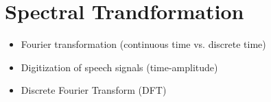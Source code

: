 
\setcounter{chapter}{2}
\chapter{Spectral Trandformation}
\thispagestyle{plain}

\begin{corollary}

	\hspace*{10mm}
	
	\vspace{5mm} %
	
	\begin{itemize}
		
			\item Fourier transformation (continuous time vs. discrete time)
			\item Digitization of speech signals (time-amplitude)
			\item Discrete Fourier Transform (DFT)
			
	\end{itemize}
\end{corollary}
\newpage



